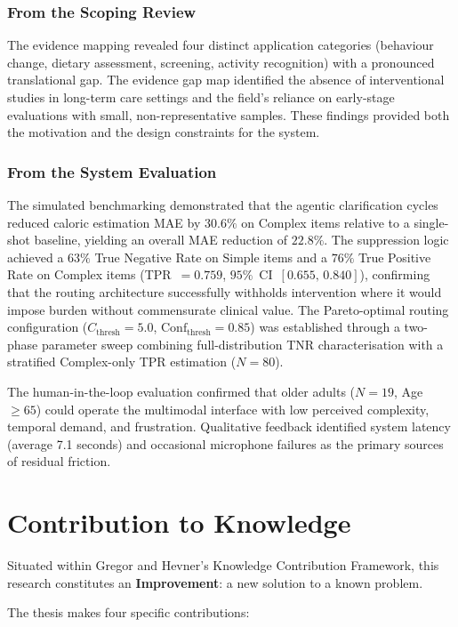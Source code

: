 \subsubsection{From the Scoping Review}
The evidence mapping revealed four distinct application categories (behaviour change, dietary assessment, screening, activity recognition) with a pronounced translational gap. The evidence gap map identified the absence of interventional studies in long-term care settings and the field's reliance on early-stage evaluations with small, non-representative samples. These findings provided both the motivation and the design constraints for the system.

\subsubsection{From the System Evaluation}
The simulated benchmarking demonstrated that the agentic clarification cycles reduced caloric estimation MAE by $30.6\%$ on Complex items relative to a single-shot baseline, yielding an overall MAE reduction of $22.8\%$. The suppression logic achieved a $63\%$ True Negative Rate on Simple items and a $76\%$ True Positive Rate on Complex items (TPR~$= 0.759$, $95\%$~CI~$[0.655,\, 0.840]$), confirming that the routing architecture successfully withholds intervention where it would impose burden without commensurate clinical value. The Pareto-optimal routing configuration ($C_{\text{thresh}}=5.0$, $\text{Conf}_{\text{thresh}}=0.85$) was established through a two-phase parameter sweep combining full-distribution TNR characterisation with a stratified Complex-only TPR estimation ($N=80$).

The human-in-the-loop evaluation confirmed that older adults ($N=19$, Age $\geq 65$) could operate the multimodal interface with low perceived complexity, temporal demand, and frustration. Qualitative feedback identified system latency (average 7.1 seconds) and occasional microphone failures as the primary sources of residual friction.

\section{Contribution to Knowledge}

Situated within Gregor and Hevner's \citep{gregorNatureTheoryInformation2006} Knowledge Contribution Framework, this research constitutes an \textbf{Improvement}: a new solution to a known problem.

The thesis makes four specific contributions:

